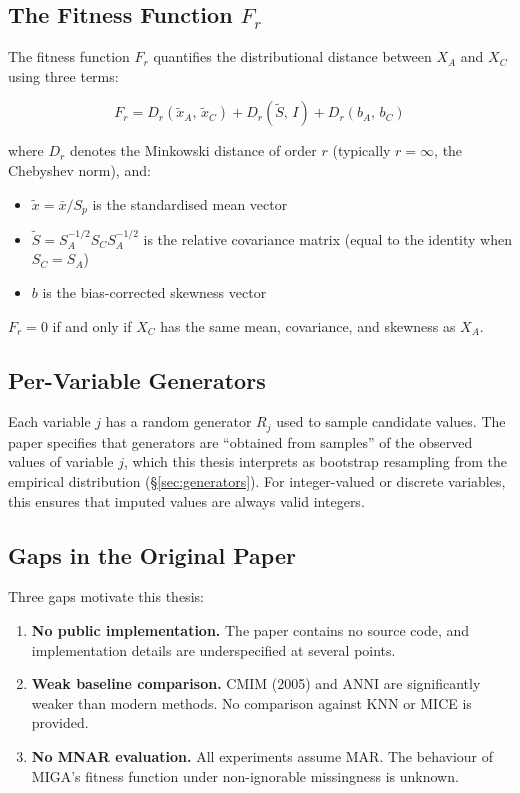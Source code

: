 \subsection{The Fitness Function $F_r$}

The fitness function $F_r$ quantifies the distributional distance between $X_A$ and $X_C$ using three terms:

\begin{equation}
    F_r = D_r(\tilde{x}_A,\, \tilde{x}_C) + D_r(\tilde{S},\, I) + D_r(b_A,\, b_C)
    \label{eq:fr_full}
\end{equation}

where $D_r$ denotes the Minkowski distance of order $r$ (typically $r = \infty$, the Chebyshev norm), and:
\begin{itemize}
    \item $\tilde{x} = \bar{x} / S_p$ is the standardised mean vector
    \item $\tilde{S} = S_A^{-1/2} S_C S_A^{-1/2}$ is the relative covariance matrix (equal to the identity when $S_C = S_A$)
    \item $b$ is the bias-corrected skewness vector
\end{itemize}

$F_r = 0$ if and only if $X_C$ has the same mean, covariance, and skewness as $X_A$.

\subsection{Per-Variable Generators}

Each variable $j$ has a random generator $R_j$ used to sample candidate values. The paper specifies that generators are ``obtained from samples'' of the observed values of variable $j$, which this thesis interprets as bootstrap resampling from the empirical distribution (\S\ref{sec:generators}). For integer-valued or discrete variables, this ensures that imputed values are always valid integers.

\subsection{Gaps in the Original Paper}

Three gaps motivate this thesis:

\begin{enumerate}
    \item \textbf{No public implementation.} The paper contains no source code, and implementation details are underspecified at several points.
    \item \textbf{Weak baseline comparison.} CMIM (2005) and ANNI are significantly weaker than modern methods. No comparison against KNN or MICE is provided.
    \item \textbf{No MNAR evaluation.} All experiments assume MAR. The behaviour of MIGA's fitness function under non-ignorable missingness is unknown.
\end{enumerate}


